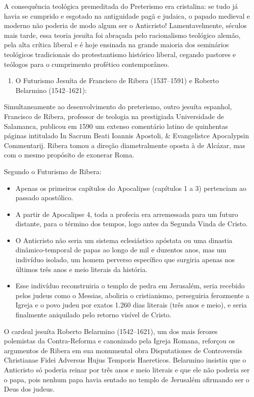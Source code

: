 \documentclass[11pt,a4paper,openany]{book}
\begin{document}
A consequência teológica premeditada do Preterismo era cristalina: se tudo já havia se cumprido e esgotado na antiguidade pagã e judaica, o papado medieval e moderno não poderia de modo algum ser o Anticristo! Lamentavelmente, séculos mais tarde, essa teoria jesuíta foi abraçada pelo racionalismo teológico alemão, pela alta crítica liberal e é hoje ensinada na grande maioria dos seminários teológicos tradicionais do protestantismo histórico liberal, cegando pastores e teólogos para o cumprimento profético contemporâneo.

\begin{enumerate}
  \item O Futurismo Jesuíta de Francisco de Ribera (1537–1591) e Roberto Belarmino (1542–1621):
\end{enumerate}

Simultaneamente ao desenvolvimento do preterismo, outro jesuíta espanhol, Francisco de Ribera, professor de teologia na prestigiada Universidade de Salamanca, publicou em 1590 um extenso comentário latino de quinhentas páginas intitulado In Sacrum Beati Ioannis Apostoli, \& Evangelistce Apocalypsin Commentarij. Ribera tomou a direção diametralmente oposta à de Alcázar, mas com o mesmo propósito de exonerar Roma.

Segundo o Futurismo de Ribera:
\begin{itemize}
  \item Apenas os primeiros capítulos do Apocalipse (capítulos 1 a 3) pertenciam ao passado apostólico.
  \item A partir de Apocalipse 4, toda a profecia era arremessada para um futuro distante, para o término dos tempos, logo antes da Segunda Vinda de Cristo.
  \item O Anticristo não seria um sistema eclesiástico apóstata ou uma dinastia dinâmico-temporal de papas ao longo de mil e duzentos anos, mas um indivíduo isolado, um homem perverso específico que surgiria apenas nos últimos três anos e meio literais da história.
  \item Esse indivíduo reconstruiria o templo de pedra em Jerusalém, seria recebido pelos judeus como o Messias, aboliria o cristianismo, perseguiria ferozmente a Igreja e o povo judeu por exatos 1.260 dias literais (três anos e meio), e seria finalmente aniquilado pelo retorno visível de Cristo.
\end{itemize}


O cardeal jesuíta Roberto Belarmino (1542–1621), um dos mais ferozes polemistas da Contra-Reforma e canonizado pela Igreja Romana, reforçou os argumentos de Ribera em sua monumental obra Disputationes de Controversiis Christianae Fidei Adversus Hujus Temporis Haereticos. Belarmino insistiu que o Anticristo só poderia reinar por três anos e meio literais e que ele não poderia ser o papa, pois nenhum papa havia sentado no templo de Jerusalém afirmando ser o Deus dos judeus.
\end{document}
